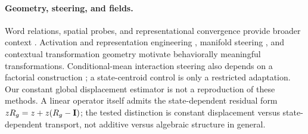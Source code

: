 \paragraph{Geometry, steering, and fields.}
Word relations, spatial probes, and representational convergence provide broader context \citep{mikolov2013linguistic,bolukbasi2016man,gurnee2023language,huh2024platonic}. Activation and representation engineering \citep{turner2023activation,zou2023representation}, manifold steering \citep{wurgaft2026manifold}, and contextual transformation geometry \citep{hu2026language} motivate behaviorally meaningful transformations. Conditional-mean interaction steering also depends on a factorial construction \citep{arora2026causal}; a state-centroid control is only a restricted adaptation. Our constant global displacement estimator is not a reproduction of these methods. A linear operator itself admits the state-dependent residual form $zR_g=z+z(R_g-\mathbf{I})$; the tested distinction is constant displacement versus state-dependent transport, not additive versus algebraic structure in general.

